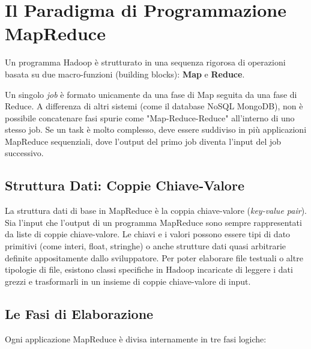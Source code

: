 \section{Il Paradigma di Programmazione MapReduce}
Un programma Hadoop è strutturato in una sequenza rigorosa di operazioni basata su due macro-funzioni (building blocks): \textbf{Map} e \textbf{Reduce}. 

\begin{remark}
    Un singolo \textit{job} è formato unicamente da una fase di Map seguita da una fase di Reduce. A differenza di altri sistemi (come il database NoSQL MongoDB), non è possibile concatenare fasi spurie come "Map-Reduce-Reduce" all'interno di uno stesso job. Se un task è molto complesso, deve essere suddiviso in più applicazioni MapReduce sequenziali, dove l'output del primo job diventa l'input del job successivo.
\end{remark}

\subsection{Struttura Dati: Coppie Chiave-Valore}
La struttura dati di base in MapReduce è la coppia chiave-valore (\textit{key-value pair}). Sia l'input che l'output di un programma MapReduce sono sempre rappresentati da liste di coppie chiave-valore.
Le chiavi e i valori possono essere tipi di dato primitivi (come interi, float, stringhe) o anche strutture dati quasi arbitrarie definite appositamente dallo sviluppatore. Per poter elaborare file testuali o altre tipologie di file, esistono classi specifiche in Hadoop incaricate di leggere i dati grezzi e trasformarli in un insieme di coppie chiave-valore di input.

\subsection{Le Fasi di Elaborazione}
Ogni applicazione MapReduce è divisa internamente in tre fasi logiche:

